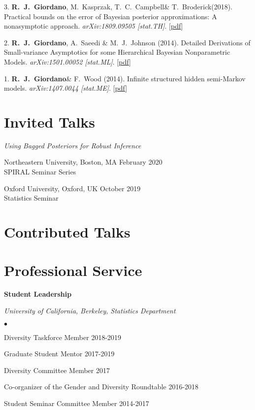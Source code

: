 \documentclass[margin,line]{res}
\newenvironment{list2}{
  \begin{list}{$\bullet$}{%
      \setlength{\itemsep}{0in}
      \setlength{\parsep}{0in} \setlength{\parskip}{0in}
      \setlength{\topsep}{0in} \setlength{\partopsep}{0in}
      \setlength{\leftmargin}{0.2in}}}{\end{list}}
\newenvironment{talkgroup}{\setlength{\parskip}{3pt}\everypar{\hangafter=1\hangindent=1em\relax}\par}{\par\everypar{\hangafter=0\relax}}
\newcommand{\me}{\textbf{R.~J.~Giordano}\xspace}
\newcommand{\trevor}{T.~C.~Campbell\xspace}
\newcommand{\tamara}{T.~Broderick\xspace}
\newcommand{\paperref}[1]{[\href{#1}{pdf}]}
\newcommand{\paperref}[1]{}
\begin{document}
\begin{resume}
3. \me, M.~Kasprzak, \trevor \& \tamara (2018).
Practical bounds on the error of Bayesian posterior approximations: A nonasymptotic approach.
\emph{arXiv:1809.09505 [stat.TH]}.
\paperref{https://arxiv.org/abs/1809.09505}

2. \me, A.~Saeedi \& M.~J.~Johnson (2014).
Detailed Derivations of Small-variance Asymptotics for some Hierarchical Bayesian Nonparametric Models.
\emph{arXiv:1501.00052 [stat.ML]}.
\paperref{http://arxiv.org/abs/1501.00052}

1. \me \& F.~Wood (2014).
Infinite structured hidden semi-Markov models.
\emph{arXiv:1407.0044 [stat.ME]}.
\paperref{http://arxiv.org/abs/1407.0044}



\section{\sc Invited Talks}

\emph{Using Bagged Posteriors for Robust Inference}

\begin{talkgroup}
Northeastern University, Boston, MA \hfill February 2020 \\
SPIRAL Seminar Series

Oxford University, Oxford, UK \hfill October 2019 \\
Statistics Seminar

\end{talkgroup}



\section{\sc Contributed Talks}

%
%
%



\section{\sc Professional Service}

\textbf{Student Leadership}

{\em University of California, Berkeley, Statistics Department}
\begin{list2}
    \item Diversity Taskforce Member \hfill 2018-2019
    \item Graduate Student Mentor \hfill 2017-2019
    \item Diversity Committee Member  \hfill 2017
    \item Co-organizer of the Gender and Diversity Roundtable \hfill 2016-2018
    \item Student Seminar Committee Member \hfill 2014-2017
\end{list2}


\end{resume}
\end{document}
